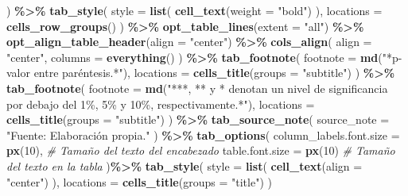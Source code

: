 \documentclass[
]{article}
\newenvironment{Shaded}{\begin{snugshade}}{\end{snugshade}}
\newcommand{\AttributeTok}[1]{\textcolor[rgb]{0.13,0.29,0.53}{#1}}
\newcommand{\CommentTok}[1]{\textcolor[rgb]{0.56,0.35,0.01}{\textit{#1}}}
\newcommand{\DecValTok}[1]{\textcolor[rgb]{0.00,0.00,0.81}{#1}}
\newcommand{\FunctionTok}[1]{\textcolor[rgb]{0.13,0.29,0.53}{\textbf{#1}}}
\newcommand{\NormalTok}[1]{#1}
\newcommand{\SpecialCharTok}[1]{\textcolor[rgb]{0.81,0.36,0.00}{\textbf{#1}}}
\newcommand{\StringTok}[1]{\textcolor[rgb]{0.31,0.60,0.02}{#1}}
\begin{document}
\begin{Shaded}
\begin{Highlighting}[]
\NormalTok{  ) }\SpecialCharTok{\%\textgreater{}\%}
  \FunctionTok{tab\_style}\NormalTok{(}
    \AttributeTok{style =} \FunctionTok{list}\NormalTok{(}
      \FunctionTok{cell\_text}\NormalTok{(}\AttributeTok{weight =} \StringTok{"bold"}\NormalTok{)}
\NormalTok{    ),}
    \AttributeTok{locations =} \FunctionTok{cells\_row\_groups}\NormalTok{()}
\NormalTok{  ) }\SpecialCharTok{\%\textgreater{}\%}
  \FunctionTok{opt\_table\_lines}\NormalTok{(}\AttributeTok{extent =} \StringTok{"all"}\NormalTok{) }\SpecialCharTok{\%\textgreater{}\%}
  \FunctionTok{opt\_align\_table\_header}\NormalTok{(}\AttributeTok{align =} \StringTok{"center"}\NormalTok{) }\SpecialCharTok{\%\textgreater{}\%}
  \FunctionTok{cols\_align}\NormalTok{(}
    \AttributeTok{align =} \StringTok{"center"}\NormalTok{,}
    \AttributeTok{columns =} \FunctionTok{everything}\NormalTok{()}
\NormalTok{  ) }\SpecialCharTok{\%\textgreater{}\%}
  \FunctionTok{tab\_footnote}\NormalTok{(}
    \AttributeTok{footnote =} \FunctionTok{md}\NormalTok{(}\StringTok{"*p{-}valor entre paréntesis.*"}\NormalTok{),}
    \AttributeTok{locations =} \FunctionTok{cells\_title}\NormalTok{(}\AttributeTok{groups =} \StringTok{"subtitle"}\NormalTok{)}
\NormalTok{  ) }\SpecialCharTok{\%\textgreater{}\%}
  \FunctionTok{tab\_footnote}\NormalTok{(}
    \AttributeTok{footnote =} \FunctionTok{md}\NormalTok{(}\StringTok{"***, ** y * denotan un nivel de significancia}
\StringTok{                  por debajo del 1\%, 5\% y 10\%, respectivamente.*"}\NormalTok{),}
    \AttributeTok{locations =} \FunctionTok{cells\_title}\NormalTok{(}\AttributeTok{groups =} \StringTok{"subtitle"}\NormalTok{)}
\NormalTok{  ) }\SpecialCharTok{\%\textgreater{}\%}
  \FunctionTok{tab\_source\_note}\NormalTok{(}
    \AttributeTok{source\_note =} \StringTok{"Fuente: Elaboración propia."}
\NormalTok{  ) }\SpecialCharTok{\%\textgreater{}\%}
  \FunctionTok{tab\_options}\NormalTok{(}
    \AttributeTok{column\_labels.font.size =} \FunctionTok{px}\NormalTok{(}\DecValTok{10}\NormalTok{), }\CommentTok{\# Tamaño del texto del encabezado}
    \AttributeTok{table.font.size =} \FunctionTok{px}\NormalTok{(}\DecValTok{10}\NormalTok{) }\CommentTok{\# Tamaño del texto en la tabla}
\NormalTok{  )}\SpecialCharTok{\%\textgreater{}\%}
  \FunctionTok{tab\_style}\NormalTok{(}
    \AttributeTok{style =} \FunctionTok{list}\NormalTok{(}
      \FunctionTok{cell\_text}\NormalTok{(}\AttributeTok{align =} \StringTok{"center"}\NormalTok{)  }
\NormalTok{    ),}
    \AttributeTok{locations =} \FunctionTok{cells\_title}\NormalTok{(}\AttributeTok{groups =} \StringTok{"title"}\NormalTok{) }
\NormalTok{  )}
\end{Highlighting}
\end{Shaded}
\end{document}
